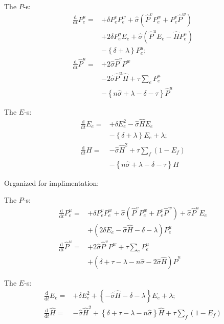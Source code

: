 \documentclass[preprint, 
superscriptaddress,aip,author-year]{revtex4-1}
\begin{document}
\noindent The $P$-s:
\begin{align}
 \frac{\mathrm{d}}{\mathrm{d} t} P_e^u  =&  
+ \delta P_e^v  P_e^w + \hat \sigma 
\left( \hat P^v P_e^w +P_e^v \hat P^w \right)\nonumber \\
&+ 2 \delta P_e^u E_e + \hat \sigma \left(\hat P^u  E_e -\hat H  P_e^u\right) \nonumber \\
& -  \left\{ \delta + \lambda \right\} P_e^u;
\tag{PE}\\ 
\frac{\mathrm{d}}{\mathrm{d} t} \hat P^u =& 
 +2 \hat \sigma \hat P^v P^w   \nonumber \\
&  - 2 \hat \sigma \hat P^u \hat H + \tau \sum_e P_e^u 
\nonumber \\
& -\left\{ n \hat \sigma + \lambda - \delta -\tau \right\}  \hat P^u
\tag{PB}
\end{align}


\noindent The $E$-s:
\begin{align}
\frac{\mathrm{d}}{\mathrm{d} t} E_e =&
+\delta E_e^2 - \hat \sigma \hat H  E_e\nonumber \\
& - \left\{ \delta + \lambda \right\} E_e +\lambda; \tag{EE} \\
 \frac{\mathrm{d}}{\mathrm{d} t} \hat H =&
- \hat \sigma \hat H^2 + \tau \sum_{f } (1-E_f) \nonumber \\
& - \left\{ n \hat \sigma + \lambda - \delta - \tau \right\} \hat H
\tag{EB} 
 \end{align}


\newpage
Organized for implimentation:

\noindent The $P$-s:
\begin{align}
 \frac{\mathrm{d}}{\mathrm{d} t} P_e^u  =&  
+ \delta P_e^v  P_e^w + \hat \sigma 
\left( \hat P^v P_e^w +P_e^v \hat P^w \right) + \hat \sigma \hat P^u E_e \nonumber \\
&+\left( 2 \delta E_e - \hat \sigma \hat H - \delta - \lambda \right) P_e^u  
\tag{PE}\\ 
\frac{\mathrm{d}}{\mathrm{d} t} \hat P^u =& 
 +2 \hat \sigma \hat P^v P^w  + \tau \sum_e P_e^u  \nonumber \\
&  + \left( \delta +\tau - \lambda  - n \hat \sigma - 2 \hat \sigma \hat H \right) \hat P^u
\tag{PB}
\end{align}


\noindent The $E$-s:
\begin{align}
\frac{\mathrm{d}}{\mathrm{d} t} E_e =&
+\delta E_e^2 + \left\{ - \hat \sigma \hat H - \delta - \lambda \right\} E_e +\lambda; \tag{EE} \\
 \frac{\mathrm{d}}{\mathrm{d} t} \hat H =&
- \hat \sigma \hat H^2 + \left\{  \delta + \tau - \lambda  - n \hat
  \sigma \right\} \hat H + \tau \sum_{f } (1-E_f)
\tag{EB} 
 \end{align}
\end{document}
